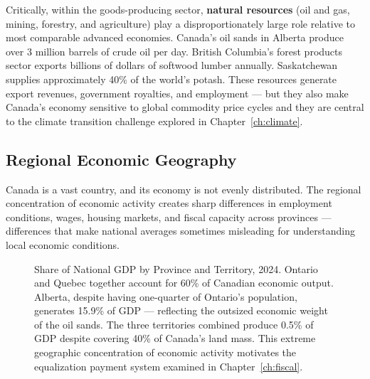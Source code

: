 Critically, within the goods-producing sector, \textbf{natural resources}
(oil and gas, mining, forestry, and agriculture) play a disproportionately
large role relative to most comparable advanced economies. Canada's oil sands
in Alberta produce over 3 million barrels of crude oil per day. British
Columbia's forest products sector exports billions of dollars of softwood lumber
annually. Saskatchewan supplies approximately 40\% of the world's potash.
These resources generate export revenues, government royalties, and employment ---
but they also make Canada's economy sensitive to global commodity price cycles
and they are central to the climate transition challenge explored in
Chapter~\ref{ch:climate}.

\subsection{Regional Economic Geography}

Canada is a vast country, and its economy is not evenly distributed. The
regional concentration of economic activity creates sharp differences in
employment conditions, wages, housing markets, and fiscal capacity across
provinces --- differences that make national averages sometimes misleading
for understanding local economic conditions.

\begin{figure}[H]
\centering
{}
\caption{Share of National GDP by Province and Territory, 2024.
Ontario and Quebec together account for 60\% of Canadian economic output.
Alberta, despite having one-quarter of Ontario's population, generates 15.9\%
of GDP --- reflecting the outsized economic weight of the oil sands. The three
territories combined produce 0.5\% of GDP despite covering 40\% of Canada's
land mass. This extreme geographic concentration of economic activity motivates
the equalization payment system examined in Chapter~\ref{ch:fiscal}.}
\label{fig:gdp_by_province}
\end{figure}

